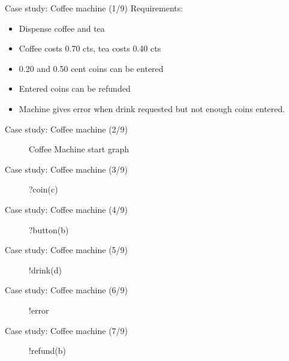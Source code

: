\documentclass{FMTslides}
\begin{document}
\begin{frame}{Case study: Coffee machine (1/9)}
Requirements:
\begin{itemize}
\item Dispense coffee and tea
\item Coffee costs 0.70 cts, tea costs 0.40 cts
\item 0.20 and 0.50 cent coins can be entered
\item Entered coins can be refunded
\item Machine gives error when drink requested but not enough coins entered.
\end{itemize}
\end{frame}

\begin{frame}{Case study: Coffee machine (2/9)}
\begin{figure}
\centering

\caption*{Coffee Machine start graph}
\end{figure}
\end{frame}

\begin{frame}{Case study: Coffee machine (3/9)}
\begin{figure}
\centering

\caption*{?coin(c)}
\end{figure}
\end{frame}

\begin{frame}{Case study: Coffee machine (4/9)}
\begin{figure}
\centering

\caption*{?button(b)}
\end{figure}
\end{frame}

\begin{frame}{Case study: Coffee machine (5/9)}
\begin{figure}
\centering

\caption*{!drink(d)}
\end{figure}
\end{frame}

\begin{frame}{Case study: Coffee machine (6/9)}
\begin{figure}
\centering

\caption*{!error}
\end{figure}
\end{frame}

\begin{frame}{Case study: Coffee machine (7/9)}
\begin{figure}
\centering

\caption*{!refund(b)}
\end{figure}
\end{frame}
\end{document}
